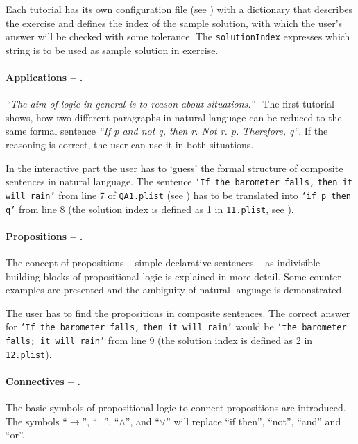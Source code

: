 Each tutorial has its own configuration file 
(see )
with a dictionary that
describes the exercise and defines the index of the sample solution,
with which the user's answer will be checked with some tolerance.
The \verb+solutionIndex+ expresses which string 
is to be used as sample solution in exercise.

\paragraph{Applications – .}
\label{tut:11}
{\em{}“The aim of logic in general is to reason about situations.”}\ \cite{Huth:2004:LCS:975331} 
The first tutorial shows, how two different paragraphs in natural language 
can be reduced to the same formal sentence {\em“If p and not q, then r. Not r. p. Therefore, q“}. 
If the reasoning is correct, the user can use it in both situations. 

In the interactive part the user has to ‘guess’ the formal structure of composite sentences in natural language. 
The sentence 
\verb+‘If the barometer falls,+ \verb+then it will rain’+ 
from line 7 of \verb+QA1.plist+ (see )
has to be translated into
\verb+‘if p then q’+ from line 8 (the solution index is defined as 1 in \verb+11.plist+, see ).

\paragraph{Propositions – .}
\label{tut:12}

The concept of propositions – simple declarative sentences – 
as indivisible building blocks of propositional logic 
is explained in more detail. Some counter-examples are presented 
and the ambiguity of natural language is demonstrated.

The user has to find the propositions in composite sentences. 
The correct answer for 
\verb+‘If the barometer falls,+ \verb+then it will rain’+ 
would be  
\verb+‘the barometer falls; it will rain’+ 
from line 9 
(the solution index is defined as 2 in \verb+12.plist+).


\paragraph{Connectives – .}
\label{tut:13}
The basic symbols of propositional logic to connect propositions are introduced. 
The symbols “$\rightarrow$”, “$\neg$”, “$\wedge$”, and “$\vee$”
 will replace “if then”, “not”, “and” and “or”. 

